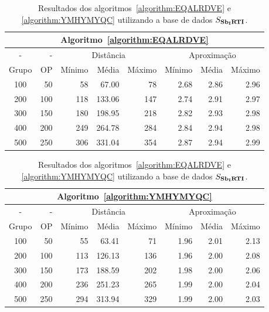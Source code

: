 \begin{table}[!htb]
  \caption{Resultados dos algoritmos~\ref{algorithm:EQALRDVE} e \ref{algorithm:YMHYMYQC} utilizando a base de dados $S_{\textbf{Sb\textsubscript{I}RTI}}{}$.}
  \label{table:SANZHOMN}
  \centering
  \begin{tabular}{|c|r|r|r|r|r|r|r|}
    \hline
    \multicolumn{8}{|c|}{Algoritmo~\ref{algorithm:EQALRDVE}}                                                  \\ \hline
      -      &  -   & \multicolumn{3}{c|}{Distância}             & \multicolumn{3}{c|}{Aproximação}           \\ \hline
    Grupo    & OP   & Mínimo       & Média        & Máximo       & Mínimo       & Média        & Máximo       \\ \hline  
    100      & 50   & 58           &  67.00       & 78           & 2.68         & 2.86         & 2.96         \\ \hline
    200      & 100  & 118          & 133.06       & 147          & 2.74         & 2.91         & 2.97         \\ \hline
    300      & 150  & 180          & 198.95       & 218          & 2.82         & 2.93         & 2.98         \\ \hline
    400      & 200  & 249          & 264.78       & 284          & 2.84         & 2.94         & 2.98         \\ \hline
    500      & 250  & 306          & 331.04       & 354          & 2.87         & 2.94         & 2.99         \\ \hline    
  \end{tabular}

  \vspace{5mm}

  \begin{tabular}{|c|r|r|r|r|r|r|r|}
    \hline
    \multicolumn{8}{|c|}{Algoritmo~\ref{algorithm:YMHYMYQC}}                                                  \\ \hline
      -      &  -   & \multicolumn{3}{c|}{Distância}             & \multicolumn{3}{c|}{Aproximação}           \\ \hline
    Grupo    & OP   & Mínimo       & Média        & Máximo       & Mínimo       & Média        & Máximo       \\ \hline  
    100      & 50   & 55           & 63.41        & 71           & 1.96         & 2.01         & 2.13         \\ \hline
    200      & 100  & 113          & 126.13       & 136          & 1.96         & 2.00         & 2.08         \\ \hline
    300      & 150  & 173          & 188.59       & 202          & 1.98         & 2.00         & 2.06         \\ \hline
    400      & 200  & 236          & 251.23       & 265          & 1.99         & 2.00         & 2.04         \\ \hline
    500      & 250  & 294          & 313.94       & 329          & 1.99         & 2.00         & 2.03         \\ \hline    
  \end{tabular}
\end{table}